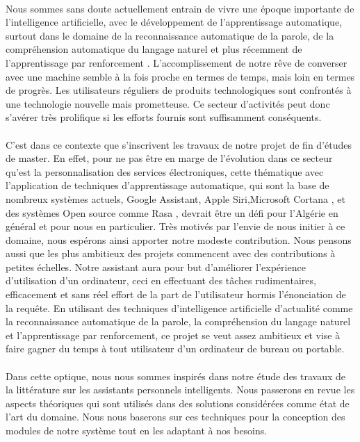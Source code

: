 \paragraph{}
Nous sommes sans doute actuellement entrain de vivre une époque importante de l'intelligence artificielle, avec le développement de l'apprentissage automatique, surtout dans le domaine de la reconnaissance automatique de la parole, de la compréhension automatique du langage naturel et plus récemment de l'apprentissage par renforcement \citep{SPA-overview}. L'accomplissement de notre rêve de converser avec une machine semble à la fois proche en termes de temps, mais loin en termes de progrès. Les utilisateurs réguliers de produits technologiques sont confrontés à une technologie nouvelle mais prometteuse. Ce secteur d'activités peut donc s'avérer très prolifique si les efforts fournis sont suffisamment conséquents.

\paragraph{}
C'est dans ce contexte que s'inscrivent les travaux de notre projet de fin d'études de master. En effet, pour ne pas être en marge de l'évolution dans ce secteur qu'est la personnalisation des services électroniques, cette thématique avec l'application de techniques d'apprentissage automatique, qui sont la base de nombreux systèmes actuels, Google Assistant, Apple Siri,Microsoft Cortana \citep{spas_battle_royal}, et des systèmes Open source comme Rasa \citep{rasa_nlu}, devrait être un défi  pour l'Algérie en général et  pour nous en particulier. Très motivés par l'envie de nous initier à ce domaine, nous espérons ainsi apporter notre modeste contribution. Nous pensons aussi que les plus ambitieux des projets commencent avec des contributions à petites échelles. Notre assistant aura pour but d'améliorer l'expérience d'utilisation d'un ordinateur, ceci en effectuant des tâches rudimentaires, efficacement et sans réel effort de la part de l'utilisateur hormis l'énonciation de la requête. En utilisant des techniques d'intelligence artificielle d'actualité comme la reconnaissance automatique de la parole, la compréhension du langage naturel et l'apprentissage par renforcement, ce projet se veut assez ambitieux et vise à faire gagner du temps à tout utilisateur d'un ordinateur de bureau ou portable.
	
\paragraph{}
Dans cette optique, nous nous sommes inspirés dans notre étude des travaux de la littérature sur les assistants personnels intelligents. Nous passerons en revue les aspects théoriques qui sont utilisés dans des solutions considérées comme état de l'art du domaine. Nous nous baserons sur ces techniques pour la conception des modules de notre système tout en les adaptant à nos besoins. 

